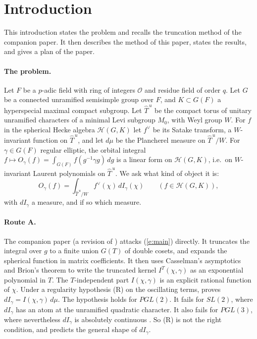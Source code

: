 \documentclass[12pt,letterpaper]{article}
\numberwithin{equation}{section}
\theoremstyle{plain}
\theoremstyle{definition}
\theoremstyle{remark}
\newcommand{\OO}{\mathcal{O}}
\newcommand{\Hc}{\mathcal{H}}
\newcommand{\Thu}{\widehat{T}^{\,u}}
\begin{document}
\section{Introduction}\label{s:intro}

This introduction states the problem and recalls the truncation method of the companion paper. It then describes the method of this paper, states the results, and gives a plan of the paper.

\paragraph{The problem.} Let $F$ be a $p$-adic field with ring of integers $\OO$ and residue field of order $q$. Let $G$ be a connected unramified semisimple group over $F$, and $K\subset G(F)$ a hyperspecial maximal compact subgroup. Let $\Thu$ be the compact torus of unitary unramified characters of a minimal Levi subgroup $M_0$, with Weyl group $W$. For $f$ in the spherical Hecke algebra $\Hc(G,K)$ let $f^\vee$ be its Satake transform, a $W$-invariant function on $\Thu$, and let $d\mu$ be the Plancherel measure on $\Thu/W$. For $\gamma\in G(F)$ regular elliptic, the orbital integral $f\mapsto O_\gamma(f)=\int_{G(F)}f(g^{-1}\gamma g)\,dg$ is a linear form on $\Hc(G,K)$, i.e.\ on $W$-invariant Laurent polynomials on $\Thu$. We ask what kind of object it is:
\begin{equation}\label{e:main}
O_\gamma(f)=\int_{\Thu/W}f^\vee(\chi)\,dI_\gamma(\chi)\qquad(f\in\Hc(G,K)),
\end{equation}
with $dI_\gamma$ a measure, and if so which measure.

\paragraph{Route A.} The companion paper \cite{JC26} (a revision of \cite{Jo92}) attacks (\ref{e:main}) directly. It truncates the integral over $g$ to a finite union $G(T)$ of double cosets, and expands the spherical function in matrix coefficients. It then uses Casselman's asymptotics and Brion's theorem to write the truncated kernel $I^T(\chi,\gamma)$ as an exponential polynomial in $T$. The $T$-independent part $I(\chi,\gamma)$ is an explicit rational function of $\chi$. Under a regularity hypothesis (R) on the oscillating terms, \cite[Thm.~4.5]{JC26} proves $dI_\gamma=I(\chi,\gamma)\,d\mu$. The hypothesis holds for $PGL(2)$. It fails for $SL(2)$, where $dI_\gamma$ has an atom at the unramified quadratic character. It also fails for $PGL(3)$, where nevertheless $dI_\gamma$ is absolutely continuous \cite[App.~A]{JC26}. So (R) is not the right condition, and \cite[Conj.~4.6]{JC26} predicts the general shape of $dI_\gamma$.
\end{document}
